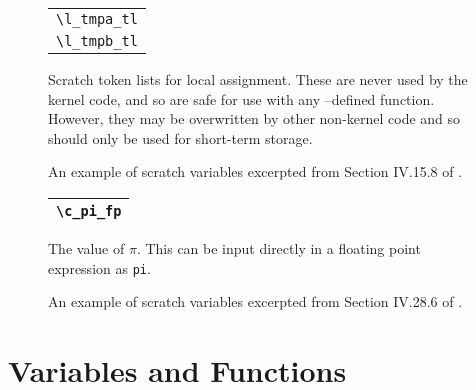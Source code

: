 \documentclass{ltugboat}
\begin{document}
\begin{figure*}
\centering
\begin{minipage}[t]{0.15\linewidth}
\begin{tabular}{l}
\toprule
\verb|\l_tmpa_tl|\\
\verb|\l_tmpb_tl| \\ \bottomrule
\end{tabular}
\end{minipage}
\begin{minipage}[t]{0.83\linewidth}
\vspace*{-1em}
Scratch token lists for local assignment.
These are never used by the kernel code, and so are safe for use with any \liii--defined function.
However, they may be overwritten by other non-kernel code and so should only be used for short-term storage.
\end{minipage}
\caption{An example of scratch variables excerpted from Section IV.15.8 of \protect\cite{l3interface}.}
\label{fig:l3-scratch-var-example}
\end{figure*}
\begin{figure*}
\centering
\begin{minipage}[t]{0.15\linewidth}
\begin{tabular}{l}
\toprule
\verb|\c_pi_fp|\\ \bottomrule
\end{tabular}
\end{minipage}
\begin{minipage}[t]{0.83\linewidth}
The value of $\pi$. This can be input directly in a floating point expression as \texttt{pi}.
\end{minipage}
\caption{An example of scratch variables excerpted from Section IV.28.6 of \protect\cite{l3interface}.}
\label{fig:l3-constant-example}
\end{figure*}
\section{Variables and Functions}
\appendix
\end{document}
